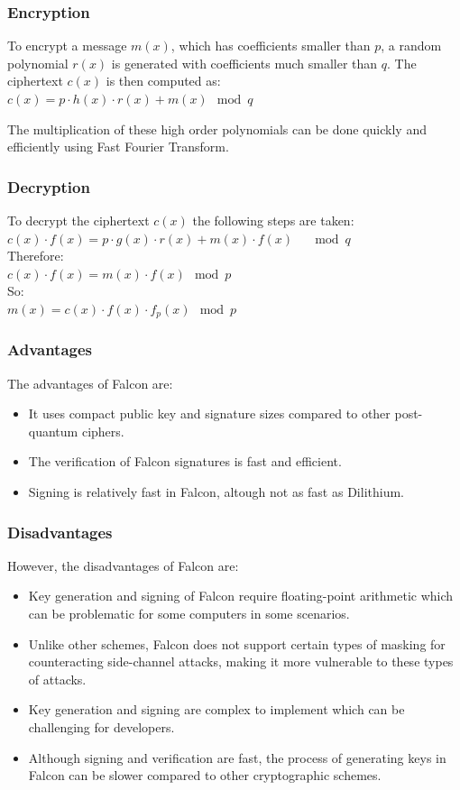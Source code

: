 \documentclass{article}
\begin{document}
\subsubsection{Encryption}
To encrypt a message $m(x)$, which has coefficients smaller than $p$, a random
polynomial $r(x)$ is generated with coefficients much smaller than $q$. The
ciphertext $c(x)$ is then computed as:\\

$c(x) = p \cdot h(x) \cdot r(x)+m(x) \mod{q}$

The multiplication of these high order polynomials can be done quickly and efficiently using Fast Fourier Transform.

\subsubsection{Decryption}
To decrypt the ciphertext $c(x)$ the following steps are taken:\\
$c(x)\cdot f(x) = p\cdot g(x)\cdot r(x) + m(x)\cdot f(x)\quad \mod{q}$ \\
Therefore:\\
$c(x)\cdot f(x) = m(x)\cdot f(x) \mod{p}$ \\
So:\\
$m(x) = c(x)\cdot f(x)\cdot f_p(x) \mod{p}$

\subsubsection{Advantages}
The advantages of Falcon are:\\
\begin{itemize}
    \item It uses compact public key and signature sizes compared to other post-quantum ciphers.
    \item The verification of Falcon signatures is fast and efficient.
    \item Signing is relatively fast in Falcon, altough not as fast as Dilithium.
\end{itemize}

 \subsubsection{Disadvantages}
However, the disadvantages of Falcon are:
\begin{itemize}
    \item Key generation and signing of Falcon require floating-point arithmetic which can be problematic for some computers in some scenarios.
    \item Unlike other schemes, Falcon does not support certain types of masking for counteracting side-channel attacks, making it more vulnerable to these types of attacks.
    \item Key generation and signing are complex to implement which can be challenging for developers.
    \item Although signing and verification are fast, the process of generating keys in Falcon can be slower compared to other cryptographic schemes.
\end{itemize}
\end{document}
